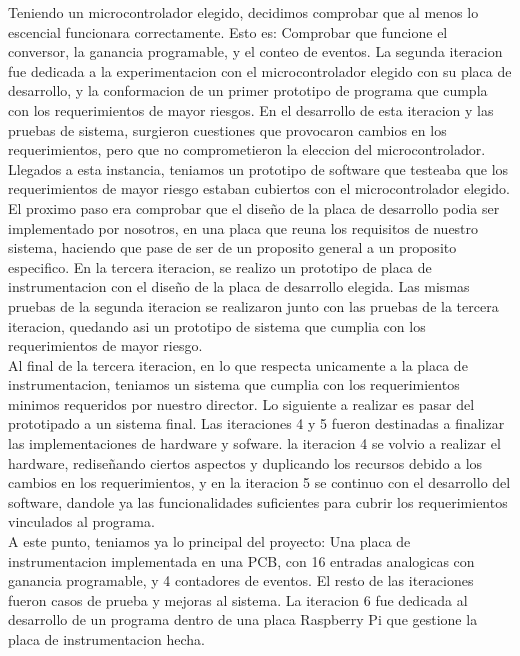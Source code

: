Teniendo un microcontrolador elegido, decidimos comprobar que al menos lo escencial funcionara correctamente. Esto es: Comprobar que funcione el conversor, la ganancia programable, y el conteo de eventos. La segunda iteracion fue dedicada a la experimentacion con el microcontrolador elegido con su placa de desarrollo, y la conformacion de un primer prototipo de programa que cumpla con los requerimientos de mayor riesgos. En el desarrollo de esta iteracion y las pruebas de sistema, surgieron cuestiones que provocaron cambios en los requerimientos, pero que no comprometieron la eleccion del microcontrolador.  \\

Llegados a esta instancia, teniamos un prototipo de software que testeaba que los requerimientos de mayor riesgo estaban cubiertos con el microcontrolador elegido. El proximo paso era comprobar que el diseño de la placa de desarrollo podia ser implementado por nosotros, en una placa que reuna los requisitos de nuestro sistema, haciendo que pase de ser de un proposito general a un proposito especifico. En la tercera iteracion, se realizo un prototipo de placa de instrumentacion con el diseño de la placa de desarrollo elegida. Las mismas pruebas de la segunda iteracion se realizaron junto con las pruebas de la tercera iteracion, quedando asi un prototipo de sistema que cumplia con los requerimientos de mayor riesgo. \\

Al final de la tercera iteracion, en lo que respecta unicamente a la placa de instrumentacion, teniamos un sistema que cumplia con los requerimientos minimos requeridos por nuestro director. Lo siguiente a realizar es pasar del prototipado a un sistema final. Las iteraciones 4 y 5 fueron destinadas a finalizar las implementaciones de hardware y sofware. \En la iteracion 4 se volvio a realizar el hardware, rediseñando ciertos aspectos y duplicando los recursos debido a los cambios en los requerimientos, y en la iteracion 5 se continuo con el desarrollo del software, dandole ya las funcionalidades suficientes para cubrir los requerimientos vinculados al programa. \\

A este punto, teniamos ya lo principal del proyecto: Una placa de instrumentacion implementada en una PCB, con 16 entradas analogicas con ganancia programable, y 4 contadores de eventos. El resto de las iteraciones fueron casos de prueba y mejoras al sistema. 
La iteracion 6 fue dedicada al desarrollo de un programa dentro de una placa Raspberry Pi que gestione la placa de instrumentacion hecha.  \\

